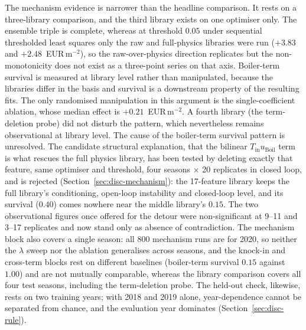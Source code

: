 The mechanism evidence is narrower than the headline comparison. It rests on a
three-library comparison, and the third library exists on one optimiser only. The ensemble
triple is complete, whereas at threshold $0.05$ under sequential thresholded least squares
only the raw and full-physics libraries were run ($+3.83$ and $+2.48$~EUR\,m$^{-2}$), so
the raw-over-physics direction replicates but the non-monotonicity does not exist as a
three-point series on that axis. Boiler-term survival is measured at library level rather
than manipulated, because the libraries differ in the basis and survival is a downstream
property of the resulting fits. The only randomised manipulation in this argument is the
single-coefficient ablation, whose median effect is $+0.21$~EUR\,m$^{-2}$. A fourth
library (the term-deletion probe) did not disturb the pattern, which nevertheless remains
observational at library level. The cause of the boiler-term survival pattern is
unresolved. The candidate structural explanation, that the bilinear
$T_{\text{in}}u_{\text{Boil}}$ term is what rescues the full physics library, has been
tested by deleting exactly that feature, same optimiser and threshold, four seasons
$\times$ 20 replicates in closed loop, and is rejected (Section~\ref{sec:disc-mechanism}):
the 17-feature library keeps the full library's conditioning, open-loop instability and
closed-loop level, and its survival ($0.40$) comes nowhere near the middle library's
$0.15$. The two observational figures once offered for the detour were non-significant at
9--11 and 3--17 replicates and now stand only as absence of contradiction. The mechanism
block also covers a single season: all 800 mechanism runs are for 2020, so neither the
$\lambda$ sweep nor the ablation generalises across seasons, and the knock-in and
cross-term blocks rest on different baselines (boiler-term survival $0.15$ against $1.00$)
and are not mutually comparable, whereas the library comparison covers all four test
seasons, including the term-deletion probe. The held-out check, likewise, rests on two
training years; with 2018 and 2019 alone, year-dependence cannot be separated from chance,
and the evaluation year dominates (Section~\ref{sec:disc-rule}).

